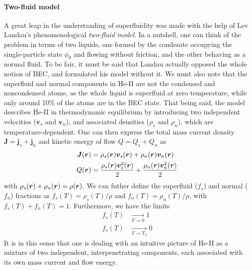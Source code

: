 \paragraph{Two-fluid model}
A great leap in the understanding of superfluidity was made with the
help of Lev Landau's phenomenological \textit{two-fluid model}. In a
nutshell, one can think of the problem in terms of two liquids, one
formed by the condesate occupying the single-particle state $\phi_0$
and flowing without friction, and the other behaving as a normal
fluid. To be fair, it must be said that Landau actually opposed the
whole notion of BEC, and formulated his model without it. We must also
note that the superfluid and normal components in He-II are not the
condensed and noncondensed atoms, as the whole liquid is superfluid at
zero temperature, while only around 10\% of the atoms are in the BEC
state. That being said, the model describes He-II in thermodynamic
equilibrium by introducing two independent velocities ($\bm{v}_s$ and
$\bm{v}_n$), and associated densities ($\rho_s$ and $\rho_n$), which
are temperature-dependent. One can then express the total mass current
density $\bm{J} = \bm{j}_s + \bm{j}_n$ and kinetic energy of flow
$Q = Q_s + Q_n$ as~\cite{leggett2006quantum}
\begin{align}
  \bm{J}(\bm{r}) & = \rho_s(\bm{r})\bm{v}_s(\bm{r}) + \rho_n(\bm{r})\bm{v}_n(\bm{r})\\
  Q(\bm{r}) & = \frac{\rho_s(\bm{r})\bm{v}_s^2(\bm{r})}{2} + \frac{\rho_n(\bm{r})\bm{v}_n^2(\bm{r})}{2}
\end{align}
with $\rho_s(\bm{r}) + \rho_n(\bm{r}) = \rho(\bm{r})$. We can futher define the
superfluid ($f_s$) and normal ($f_n$) fractions as
$f_s(T) = \rho_s(T)/\rho$ and $f_n(T) = \rho_n(T)/\rho$, with
$f_s(T) + f_n(T) = 1$. Furthermore, we have the limits
%
\begin{align}
  f_s(T) &\xrightarrow[T \rightarrow 0]{} 1\\
  f_s(T) &\xrightarrow[T \rightarrow T_{\lambda}]{} 0
\end{align}
%
It is in this sense that one is dealing with an intuitive picture of
He-II as a mixture of two independent, interpenetrating components,
each associated with its own mass current and flow energy.


